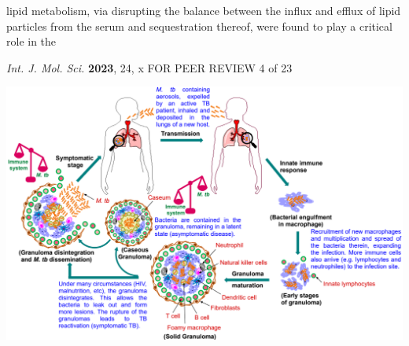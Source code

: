 \documentclass{article}
\begin{document}
lipid metabolism, via disrupting the balance between the influx and efflux of lipid particles from the serum and sequestration thereof, were found to play a critical role in the

\textit{Int. J. Mol. Sci.} \textbf{2023}, 24, x FOR PEER REVIEW 4 of 23


\includegraphics{_page_3_Figure_2.png}
\end{document}
